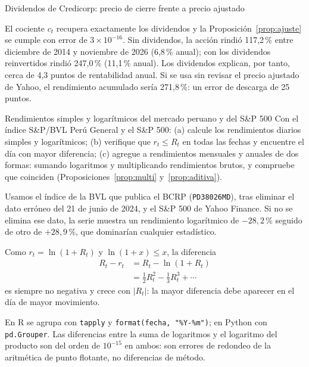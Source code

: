 \begin{ejresuelto}{Dividendos de Credicorp: precio de cierre frente a precio ajustado}
\begin{conclusion}
El cociente $c_t$ recupera exactamente los dividendos y la Proposición~\ref{prop:ajuste} se cumple con
error de $3\times10^{-16}$. Sin dividendos, la acción rindió 117,2\,\% entre diciembre de 2014 y noviembre
de 2026 (6,8\,\% anual); con los dividendos reinvertidos rindió 247,0\,\% (11,1\,\% anual). Los dividendos
explican, por tanto, cerca de 4,3 puntos de rentabilidad anual. Si se usa sin revisar el precio ajustado
de Yahoo, el rendimiento acumulado sería 271,8\,\%: un error de descarga de 25 puntos.
\end{conclusion}
\end{ejresuelto}

\begin{ejresuelto}{Rendimientos simples y logarítmicos del mercado peruano y del S\&P 500}\label{ej:logsimple}
\enunciado Con el índice S\&P/BVL Perú General y el S\&P 500: (a) calcule los rendimientos diarios
simples y logarítmicos; (b) verifique que $r_t\le R_t$ en todas las fechas y encuentre el día con mayor
diferencia; (c) agregue a rendimientos mensuales y anuales de dos formas: sumando logaritmos y
multiplicando rendimientos brutos, y compruebe que coinciden (Proposiciones~\ref{prop:multi}
y~\ref{prop:aditiva}).

\solucion
{} Usamos el índice de la BVL que publica el BCRP (\texttt{PD38026MD}), tras eliminar
el dato erróneo del 21 de junio de 2024, y el S\&P 500 de Yahoo Finance. Si no se elimina ese dato, la
serie muestra un rendimiento logarítmico de $-28{,}2$\,\% seguido de otro de $+28{,}9$\,\%, que dominarían
cualquier estadístico.

 Como $r_t=\ln(1+R_t)$ y $\ln(1+x)\le x$, la diferencia
\begin{align*}
  R_t-r_t &= R_t-\ln(1+R_t)\\
          &= \tfrac12R_t^2-\tfrac13R_t^3+\cdots
\end{align*}
es siempre no negativa y crece con $|R_t|$: la mayor diferencia debe aparecer en el día de mayor
movimiento.


\RvsPy En R se agrupa con \texttt{tapply} y \texttt{format(fecha, "\%Y-\%m")}; en Python con
\texttt{pd.Grouper}. Las diferencias entre la suma de logaritmos y el logaritmo del producto son del orden
de $10^{-15}$ en ambos: son errores de redondeo de la aritmética de punto flotante, no diferencias de
método.


\end{ejresuelto}
